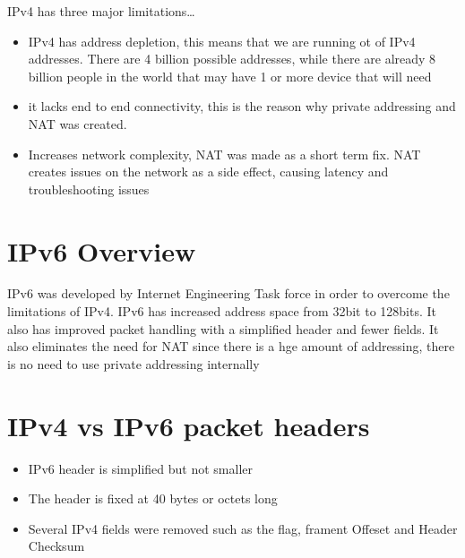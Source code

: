 \documentclass{article}
\begin{document}
\begin{flushleft}
    IPv4 has three major limitations\dots
    
    \begin{itemize}
        \item IPv4 has address depletion, this means that we are running ot of IPv4 addresses. There are 4 billion
        possible addresses, while there are already 8 billion people in the world that may have 1 or more device that will need
        \item it lacks end to end connectivity, this is the reason why private addressing and NAT was created.
        \item Increases network complexity, NAT was made as a short term fix. NAT creates issues on the network as a side effect, causing latency and troubleshooting issues
    \end{itemize}
\end{flushleft}

\section{\textbf{IPv6 Overview}}

\begin{flushleft}
    IPv6 was developed by Internet Engineering Task force in order to overcome the limitations of IPv4. IPv6 has
    increased address space from 32bit to 128bits. It also has improved packet handling with a simplified header and
    fewer fields. It also eliminates the need for NAT since there is a hge amount of addressing, there is no need
    to use private addressing internally
\end{flushleft}

\section{\textbf{IPv4 vs IPv6 packet headers}}

\begin{flushleft}

    \begin{itemize}
        \item IPv6 header is simplified but not smaller
        \item The header is fixed at 40 bytes or octets long
        \item Several IPv4 fields were removed such as the flag, frament Offeset and Header Checksum
    \end{itemize}
\end{flushleft}
\end{document}
